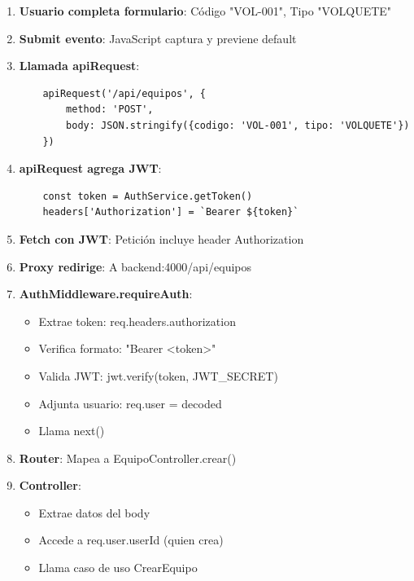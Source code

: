 \documentclass[12pt,a4paper]{article}
\begin{document}
\begin{enumerate}[leftmargin=*]
    \item \textbf{Usuario completa formulario}: Código "VOL-001", Tipo "VOLQUETE"

    \item \textbf{Submit evento}: JavaScript captura y previene default

    \item \textbf{Llamada apiRequest}:
    \begin{verbatim}
    apiRequest('/api/equipos', {
        method: 'POST',
        body: JSON.stringify({codigo: 'VOL-001', tipo: 'VOLQUETE'})
    })
    \end{verbatim}

    \item \textbf{apiRequest agrega JWT}:
    \begin{verbatim}
    const token = AuthService.getToken()
    headers['Authorization'] = `Bearer ${token}`
    \end{verbatim}

    \item \textbf{Fetch con JWT}: Petición incluye header Authorization

    \item \textbf{Proxy redirige}: A backend:4000/api/equipos

    \item \textbf{AuthMiddleware.requireAuth}:
    \begin{itemize}
        \item Extrae token: req.headers.authorization
        \item Verifica formato: "Bearer <token>"
        \item Valida JWT: jwt.verify(token, JWT\_SECRET)
        \item Adjunta usuario: req.user = decoded
        \item Llama next()
    \end{itemize}

    \item \textbf{Router}: Mapea a EquipoController.crear()

    \item \textbf{Controller}:
    \begin{itemize}
        \item Extrae datos del body
        \item Accede a req.user.userId (quien crea)
        \item Llama caso de uso CrearEquipo
    \end{itemize}


\end{enumerate}
\end{document}
